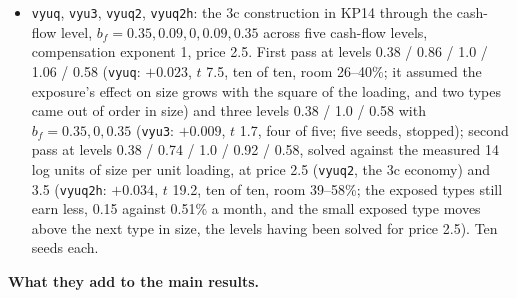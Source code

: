 \documentclass[11pt]{article}
\begin{document}
\begin{itemize}
\item \texttt{vyuq}, \texttt{vyu3}, \texttt{vyuq2}, \texttt{vyuq2h}: the 3c construction in KP14 through the cash-flow level, $b_f = 0.35, 0.09, 0, 0.09, 0.35$ across five cash-flow levels, compensation exponent 1, price 2.5. First pass at levels 0.38 / 0.86 / 1.0 / 1.06 / 0.58 (\texttt{vyuq}: $+0.023$, $t$ 7.5, ten of ten, room 26--40\%; it assumed the exposure's effect on size grows with the square of the loading, and two types came out of order in size) and three levels 0.38 / 1.0 / 0.58 with $b_f = 0.35, 0, 0.35$ (\texttt{vyu3}: $+0.009$, $t$ 1.7, four of five; five seeds, stopped); second pass at levels 0.38 / 0.74 / 1.0 / 0.92 / 0.58, solved against the measured 14 log units of size per unit loading, at price 2.5 (\texttt{vyuq2}, the 3c economy) and 3.5 (\texttt{vyuq2h}: $+0.034$, $t$ 19.2, ten of ten, room 39--58\%; the exposed types still earn less, 0.15 against 0.51\% a month, and the small exposed type moves above the next type in size, the levels having been solved for price 2.5). Ten seeds each.
\end{itemize}

\textbf{What they add to the main results.}
\end{document}
